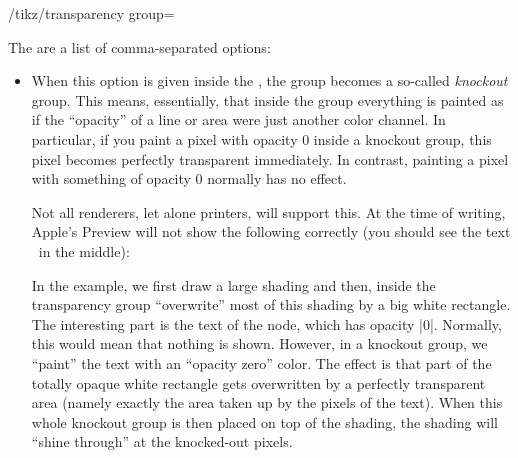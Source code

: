 \begin{key}{/tikz/transparency group=}
\begin{codeexample}[]
\end{codeexample}

    The  are a list of comma-separated options:
    \begin{itemize}
        \item {} When this option is given inside the
            , the group becomes a so-called \emph{knockout}
            group. This means, essentially, that inside the group everything is
            painted as if the ``opacity'' of a line or area were just another
            color channel. In particular, if you paint a pixel with opacity $0$
            inside a knockout group, this pixel becomes perfectly transparent
            immediately. In contrast, painting a pixel with something of
            opacity $0$ normally has no effect.

            Not all renderers, let alone printers, will support this. At the
            time of writing, Apple's Preview will not show the following
            correctly (you should see the text \tikzname\ in the middle):
\begin{codeexample}[]
\end{codeexample}
            In the example, we first draw a large shading and then, inside the
            transparency group ``overwrite'' most of this shading by a big
            white rectangle. The interesting part is the text of the node,
            which has opacity |0|. Normally, this would mean that nothing is
            shown. However, in a knockout group, we ``paint'' the text with an
            ``opacity zero'' color. The effect is that part of the totally
            opaque white rectangle gets overwritten by a perfectly transparent
            area (namely exactly the area taken up by the pixels of the text).
            When this whole knockout group is then placed on top of the
            shading, the shading will ``shine through'' at the knocked-out
            pixels.


\end{itemize}
\end{key}
